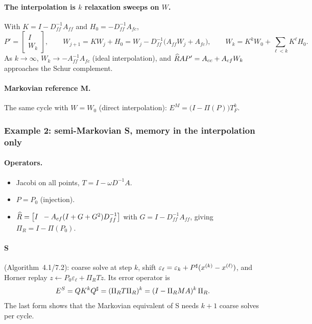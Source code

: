 \paragraph{The interpolation is $k$ relaxation sweeps on $W$.}
With $K=I-D_{ff}^{-1}A_{ff}$ and $H_0=-D_{ff}^{-1}A_{fc}$,
\begin{equation}\label{eq:twin-W}
  P'=\begin{bmatrix} I\\ W_k\end{bmatrix},\qquad
  W_{j+1}=KW_j+H_0=W_j-D_{ff}^{-1}\bigl(A_{ff}W_j+A_{fc}\bigr),\qquad
  W_k=K^kW_0+\sum_{\ell<k}K^\ell H_0 .
\end{equation}
As $k\to\infty$, $W_k\to-A_{ff}^{-1}A_{fc}$ (ideal interpolation), and $\widehat R AP'=A_{cc}+A_{cf}W_k$ approaches the
Schur complement.

\paragraph{Markovian reference M.} The same cycle with $W=W_0$ (direct interpolation):
$E^M=\bigl(I-\Pi(P)\bigr)T_F^k$.

\subsubsection{Example 2: semi-Markovian S, memory in the interpolation only}\label{sec:form-semi}

\paragraph{Operators.}
\begin{itemize}
  \item Jacobi on all points, $T=I-\omega D^{-1}A$.
  \item $P=P_0$ (injection).
  \item $\widehat R=\bigl[I\;\;-A_{cf}(I+G+G^2)D_{ff}^{-1}\bigr]$ with $G=I-D_{ff}^{-1}A_{ff}$, giving $\Pi_R=I-\Pi(P_0)$.
\end{itemize}

\paragraph{S} (Algorithm~4.1/7.2): coarse solve at step $k$, shift
$\varepsilon_\ell=\varepsilon_k+P^{\sharp}(x^{(k)}-x^{(\ell)})$, and Horner replay $z\leftarrow P_0\varepsilon_\ell+\Pi_RTz$.
Its error operator is
\begin{equation}\label{eq:ES}
  E^S=QK^kQ^{\sharp}=(\Pi_RT\Pi_R)^k=(I-\Pi_RMA)^k\,\Pi_R .
\end{equation}
The last form shows that the Markovian equivalent of S needs $k+1$ coarse solves per cycle.

